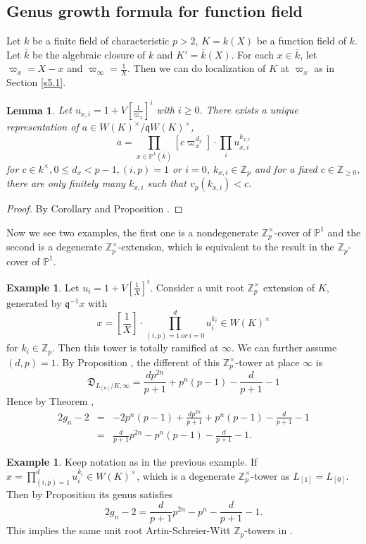\documentclass{proc-l}
\newtheorem{lemma}[theorem]{Lemma}
\theoremstyle{definition}
\newtheorem{example}[theorem]{Example}
\theoremstyle{remark}
\numberwithin{equation}{section}
\begin{document}
\subsection{Genus growth formula for function field}
Let $k$ be a finite field of characteristic $p>2$, $K=k(X)$ be a function field of $k$. Let $\bar k$ be the algebraic closure of $k$ and $K'=\bar k(X)$. For each $x\in\bar k$, let $\varpi_x=X-x$ and $\varpi_\infty=\frac{1}{X}$. Then we can do localization of $K$ at $\varpi_x$ as in  Section \ref{s5.1}. 

\begin{lemma}
    Let $u_{x,i}=1+V[\frac{1}{\varpi_x}]^i$ with $i\geq0$. There exists a unique representation of $a\in W(K)^\times/\mathfrak qW(K)^\times$,
    $$a=\prod_{x\in\mathbb P^1(\bar k)}[c\varpi_x^{d_x}]\cdot\prod_i u_{x,i}^{k_{x,i}}$$
    for $c\in k^\times, 0\leq d_x<p-1, (i,p)=1$ or $i=0$, $k_{x,i}\in\mathbb Z_p$ and for a fixed $c\in\mathbb Z_{\geq0}$, there are only finitely many $k_{x,i}$ such that $v_p(k_{x,i})<c$.
\end{lemma}
\begin{proof}
    By Corollary \boxed{\ref{3.7}} and Proposition \boxed{\ref{4.18}}.
\end{proof}

Now we see two examples, the first one is a nondegenerate $\mathbb Z_p^\times$-cover of $\mathbb P^1$ and the second is a degenerate $\mathbb Z_p^\times$-extension, which is equivalent to the result in the $\mathbb Z_p$-cover of $\mathbb P^1$.
\begin{example}\label{6.4}
    Let $u_i=1+V[\frac{1}{X}]^i$. Consider a unit root $\mathbb Z_p^\times$ extension of $K$, generated by $\mathfrak q^{-1}x$ with $$x=[\frac{1}{X}]\cdot\prod_{(i,p)=1~or~i=0}^d u_i^{k_i}\in W(K)^\times$$ for $k_i\in\mathbb Z_p$. Then this tower is totally ramified at $\infty$. We can further assume $(d,p)=1$. By Proposition \boxed{\ref{4.13}}, the different of this $\mathbb Z_p^\times$-tower at place $\infty$ is 
    $$\mathfrak D_{L_{[n]}/K,\infty}=\frac{dp^{2n}}{p+1}+p^n(p-1)-\frac{d}{p+1}-1$$ 
    Hence by Theorem \boxed{\ref{5.1}},
    \begin{eqnarray*} 
    2g_n-2&=&-2p^{n}(p-1)+\frac{dp^{2n}}{p+1}+p^n(p-1)-\frac{d}{p+1}-1\\
    &=&\frac{d}{p+1}p^{2n}-p^{n}(p-1)-\frac{d}{p+1}-1.
    \end{eqnarray*}
\end{example}
\begin{example}
    Keep notation as in the previous example. If $x=\prod_{(i,p)=1}^d u_i^{k_i}\in W(K)^\times$, which is a degenerate $\mathbb Z_p^\times$-tower as $L_{[1]}=L_{[0]}$. Then by Proposition \boxed{ \ref{4.13}} its genus satisfies 
    $$2g_n-2=\frac{d}{p+1}p^{2n}-p^{n}-\frac{d}{p+1}-1.$$
    This implies the same unit root Artin-Schreier-Witt $\mathbb Z_p$-towers in \cite[Example 5.10]{MR3754335}.
\end{example}


\end{document}

